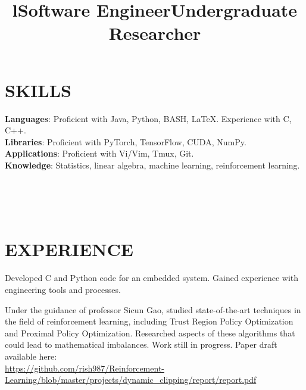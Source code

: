 \documentclass[margin]{res}
\begin{document}
\begin{resume}
\section{SKILLS}

\textbf{Languages}: 
Proficient with Java, Python, BASH, \LaTeX.
Experience with C, C++.
\\
\textbf{Libraries}: 
Proficient with PyTorch, TensorFlow, CUDA, NumPy.
\\
\textbf{Applications}: Proficient with Vi/Vim, Tmux, Git.  
\\
\textbf{Knowledge}: Statistics, linear algebra, machine learning, reinforcement learning.

\begin{format}
\title{l}\\
\\
\body\\
\end{format}

\section{EXPERIENCE}
\title{\textbf{Software Engineer}}
\begin{position}
Developed C and Python code for an embedded system. Gained experience with 
engineering tools and processes.
\end{position}

\title{\textbf{Undergraduate Researcher}}
\begin{position}
Under the guidance of professor Sicun Gao, studied state-of-the-art techniques
in the field of reinforcement learning, including Trust Region Policy
Optimization and Proximal Policy Optimization.  Researched aspects of these
algorithms that could lead to mathematical imbalances. Work still in progress.
Paper draft available here:\\
    \url{https://github.com/rish987/Reinforcement-Learning/blob/master/projects/dynamic_clipping/report/report.pdf}
\end{position}


\end{resume}
\end{document}

